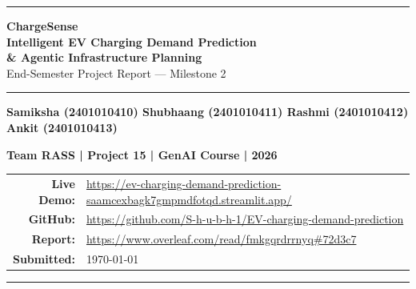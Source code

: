 \documentclass[12pt,a4paper]{article}
\begin{document}
\begin{titlepage}
\centering
\vspace*{1cm}

{\color{evblue}\rule{\linewidth}{2pt}}
\vspace{0.6cm}

{\Huge\bfseries\color{evblue}
 ChargeSense\\[0.35em]}
{\Large\bfseries\color{darkgray}
 Intelligent EV Charging Demand Prediction\\
 \& Agentic Infrastructure Planning\\[0.3em]}
{\large\color{darkgray} End-Semester Project Report — Milestone 2}

\vspace{0.4cm}
{\color{evblue}\rule{\linewidth}{2pt}}
\vspace{1.2cm}


\begin{center}
\textbf{
Samiksha (2401010410) \quad
Shubhaang (2401010411) \quad
Rashmi (2401010412) \quad
Ankit (2401010413)
}
\end{center}

\vspace{1cm}
{\large\bfseries Team RASS | Project 15 | GenAI Course | 2026}

\vspace{1.5cm}
\begin{center}
  \begin{tabular}{rl}
    \textbf{Live Demo:}&\url{https://ev-charging-demand-prediction-saamcexbagk7gmpmdfotqd.streamlit.app/} \\[4pt]
    \textbf{GitHub:}      & \url{https://github.com/S-h-u-b-h-1/EV-charging-demand-prediction} \\[4pt]
    \textbf{Report:}      & \url{https://www.overleaf.com/read/fmkgqrdrrnyq#72d3c7} \\[4pt]
    \textbf{Submitted:}   & \today \\
  \end{tabular}
\end{center}

\vfill
{\color{evblue}\rule{\linewidth}{1pt}}
\end{titlepage}
\end{document}
